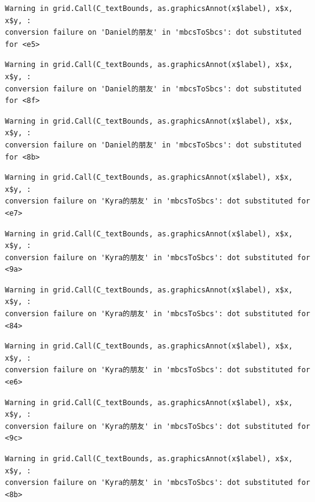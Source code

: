 \documentclass[
  letterpaper,
  DIV=11,
  numbers=noendperiod]{scrreprt}
\begin{document}
\begin{verbatim}
Warning in grid.Call(C_textBounds, as.graphicsAnnot(x$label), x$x, x$y, :
conversion failure on 'Daniel的朋友' in 'mbcsToSbcs': dot substituted for <e5>
\end{verbatim}

\begin{verbatim}
Warning in grid.Call(C_textBounds, as.graphicsAnnot(x$label), x$x, x$y, :
conversion failure on 'Daniel的朋友' in 'mbcsToSbcs': dot substituted for <8f>
\end{verbatim}

\begin{verbatim}
Warning in grid.Call(C_textBounds, as.graphicsAnnot(x$label), x$x, x$y, :
conversion failure on 'Daniel的朋友' in 'mbcsToSbcs': dot substituted for <8b>
\end{verbatim}

\begin{verbatim}
Warning in grid.Call(C_textBounds, as.graphicsAnnot(x$label), x$x, x$y, :
conversion failure on 'Kyra的朋友' in 'mbcsToSbcs': dot substituted for <e7>
\end{verbatim}

\begin{verbatim}
Warning in grid.Call(C_textBounds, as.graphicsAnnot(x$label), x$x, x$y, :
conversion failure on 'Kyra的朋友' in 'mbcsToSbcs': dot substituted for <9a>
\end{verbatim}

\begin{verbatim}
Warning in grid.Call(C_textBounds, as.graphicsAnnot(x$label), x$x, x$y, :
conversion failure on 'Kyra的朋友' in 'mbcsToSbcs': dot substituted for <84>
\end{verbatim}

\begin{verbatim}
Warning in grid.Call(C_textBounds, as.graphicsAnnot(x$label), x$x, x$y, :
conversion failure on 'Kyra的朋友' in 'mbcsToSbcs': dot substituted for <e6>
\end{verbatim}

\begin{verbatim}
Warning in grid.Call(C_textBounds, as.graphicsAnnot(x$label), x$x, x$y, :
conversion failure on 'Kyra的朋友' in 'mbcsToSbcs': dot substituted for <9c>
\end{verbatim}

\begin{verbatim}
Warning in grid.Call(C_textBounds, as.graphicsAnnot(x$label), x$x, x$y, :
conversion failure on 'Kyra的朋友' in 'mbcsToSbcs': dot substituted for <8b>
\end{verbatim}
\end{document}
